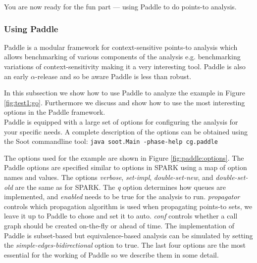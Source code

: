 \documentclass{article}
\newcommand{\code}[1]{\texttt{\small #1}}
\begin{document}
You are now ready for the fun part --- using Paddle to do points-to
analysis.

\subsubsection*{Using Paddle}
Paddle is a modular framework for context-sensitive points-to analysis
which allows benchmarking of various components of the analysis
e.g. benchmarking variations of context-sensitivity making it a very
interesting tool. Paddle is also an early $\alpha$-release and so be aware
Paddle is less than robust.

In this subsection we show how to use Paddle to analyze the example in
Figure \ref{fig:test1:go}. Furthermore we discuss and show how to use
the most interesting options in the Paddle framework.\\

Paddle is equipped with a large set of options for configuring the
analysis for your specific needs. A complete description of the
options can be obtained using the Soot commandline tool: \code{java
soot.Main -phase-help cg.paddle}

The options used for the example are shown in Figure
\ref{fig:paddle:options}. The Paddle options are specified similar to
options in SPARK using a map of option names and values. The options
\emph{verbose}, \emph{set-impl}, \emph{double-set-new}, and
\emph{double-set-old} are the same as for SPARK. The \emph{q} option
determines how queues are implemented, and \emph{enabled} needs to be
true for the analysis to run. \emph{propagator} controls which
propagation algorithm is used when propagating points-to sets, we
leave it up to Paddle to chose and set it to auto. \emph{conf}
controls whether a call graph should be created on-the-fly or ahead of
time. The implementation of Paddle is subset-based but
equivalence-based analysis can be simulated by setting the
\emph{simple-edges-bidirectional} option to true. The last four
options are the most essential for the working of Paddle so we
describe them in some detail.
\end{document}
